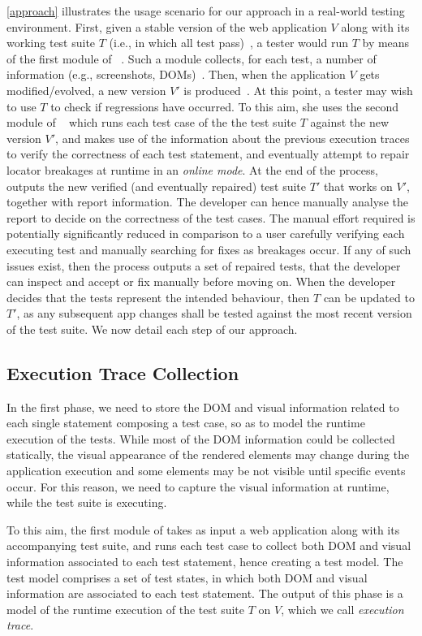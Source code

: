 \autoref{approach} illustrates the usage scenario for our approach in a real-world testing environment. 
First, given a stable version of the web application $V$ along with its working test suite $T$ (i.e., in which all test pass)~, a tester would run $T$ by means of the first module of \tool~. Such a module collects, for each test, a number of information (e.g., screenshots, DOMs)~. 
Then, when the application $V$ gets modified/evolved, a new version $V'$ is produced~. At this point, a tester may wish to use $T$ to check if regressions have occurred. To this aim, she uses the second module of \tool~ which runs each test case of the the test suite $T$ against the new version $V'$, and makes use of the information about the previous execution traces to verify the correctness of each test statement, and eventually attempt to repair locator breakages at runtime in an \textit{online mode}. At the end of the process, \tool outputs the new verified (and eventually repaired) test suite $T'$ that works on $V'$, together with report information. 
The developer can hence manually analyse the report to decide on the correctness of the test cases. The manual effort required is potentially significantly reduced in comparison to a user carefully verifying each executing test and manually searching for fixes as breakages occur. If any of such issues exist, then the process outputs a set of repaired tests, that the developer can inspect and accept or fix manually before moving on. When the developer decides that the tests represent the intended behaviour, then $T$ can be updated to $T'$, as any subsequent app changes shall be tested against the most recent version of the test suite.
%
We now detail each step of our approach.

\subsection{Execution Trace Collection}
%
In the first phase, we need to store the DOM and visual information related to each single statement composing a test case, so as to model the runtime execution of the tests. While most of the DOM information could be collected statically, the visual appearance of the rendered elements may change during the application execution and some elements may be not visible until specific events occur. For this reason, we need to capture the visual information at runtime, while the test suite is executing. 

To this aim, the first module of \tool takes as input a web application along with its accompanying test suite, and runs each test case to collect both DOM and visual information associated to each test statement, hence creating a test model. The test model comprises a set of test states, in which both DOM and visual information are associated to each test statement. The output of this phase is a model of the runtime execution of the test suite $T$ on $V$, which we call \textit{execution trace}. %

